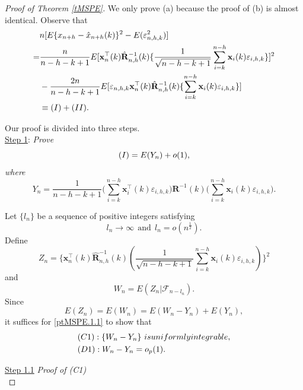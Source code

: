 \documentclass[ejsv2]{imsart}
\theoremstyle{plain}
\theoremstyle{definition}
\theoremstyle{remark}
\begin{document}
\begin{proof}[Proof of Theorem \ref{tMSPE}] We only prove (a) because
the proof of (b) is almost identical. Observe that
\begin{equation}\label{ptMSPE.1}
\begin{split}
     & n[E\{x_{n+h}-\hat{x}_{n+h}(k)\}^2-E(\varepsilon_{n,h,k}^2)] \\
    = & \frac{n}{n-h-k+1}E[\mathbf{x}^\top_n(k)\hat{\mathbf{R}}_{n,h}^{-1}(k)\{\frac{1}{\sqrt{n-h-k+1}}\sum_{i=k}^{n-h}\mathbf{x}_i(k)\varepsilon_{i,h,k}\}]^2\\
    &-\frac{2n}{n-h-k+1}E[\varepsilon_{n,h,k}\mathbf{x}^\top_n(k)\hat{\mathbf{R}}_{n,h}^{-1}(k)\{\sum_{i=k}^{n-h}\mathbf{x}_i(k)\varepsilon_{i,h,k}\}]\\
    &\equiv {\rm (I)+(II)}.
\end{split}
\end{equation}
{ Our proof is divided into three steps.\\

\noindent
\underline{Step 1}: \textit{Prove 
  \begin{equation}\label{ptMSPE.1.1}
     {\rm (I)}
   =  E(Y_n)+o(1),
\end{equation}
where
$$Y_n=\frac{1}{n-h-k+1}
\big(\sum_{i=k}^{n-h}\mathbf{x}^{\top}_i(k)\varepsilon_{i,h,k}\big)
\mathbf{R}^{-1}(k)\big(\sum_{i=k}^{n-h}\mathbf{x}_i(k)\varepsilon_{i,h,k}\big).$$}

Let $\{l_n\}$ be a sequence of positive integers satisfying
\begin{equation}\label{ln}
l_n\to\infty\ \ \textrm{and}\ \ l_n=o(n^{\frac{1}{2}}).
\end{equation}
Define
$$Z_n=\{\mathbf{x}^\top_n(k)\hat{\mathbf{R}}_{n,h}^{-1}(k)(\frac{1}{\sqrt{n-h-k+1}}\sum_{i=k}^{n-h}\mathbf{x}_i(k)\varepsilon_{i,h,k})\}^2$$
and
$$W_n=E(Z_n|\mathcal{F}_{n-l_n}).$$
Since
\begin{equation}\label{ptMSPE.1.1.00}
E(Z_n)=E(W_n)=E(W_n-Y_n)+E(Y_n),
\end{equation}
it suffices for \eqref{ptMSPE.1.1} to show that
\begin{align*}\label{ptMSPE.1.1.01}
\begin{split}
&{\rm (C1)}: \{W_n-Y_n\}\ \textrm{is uniformly integrable},\\ 
&{\rm (D1)}: W_n-Y_n=o_p(1).
\end{split}
\end{align*}

\noindent
\underline{Step 1.1} \textit{Proof of {\rm(C1)}}\\

}
\end{proof}
\end{document}
